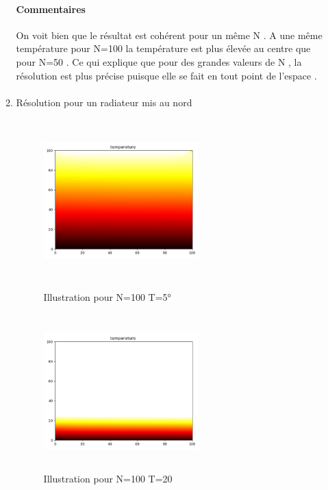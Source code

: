\documentclass{article}
\begin{document}
\begin{enumerate}
\begin{enumerate}
\paragraph{Commentaires } 
On voit bien que le résultat est cohérent pour un même N  . 
A une même température pour N=100 la température est plus élevée au centre que pour N=50 . 
Ce qui explique que pour des grandes valeurs de N , la résolution est plus précise puisque elle se fait en tout point de l'espace .  
\paragraph{}
   	\item{Résolution pour un radiateur mis au nord } 
   	\paragraph{}
   	\begin{figure}
   		\begin{minipage}[c]{.46\linewidth}
   			\centering
   			\includegraphics[width=6cm,height=6cm]{coteN100T5.png}
   			\caption{Illustration pour N=100 T=5° }
   			\label{radiateur sur le cote ( N=100 ,T=5°)}
   		\end{minipage} \hfill
 
   	\begin{minipage}[c]{.46\linewidth}
   		\centering
   		\includegraphics[width=6cm,height=6cm]{coteN100T20.png}
   		\caption{Illustration pour N=100 T=20 }
   		\label{radiateur sur le cote ( N=100 , T=20 )}
   	\end{minipage} \hfill


\end{figure}
\end{enumerate}
\end{enumerate}
\end{document}
